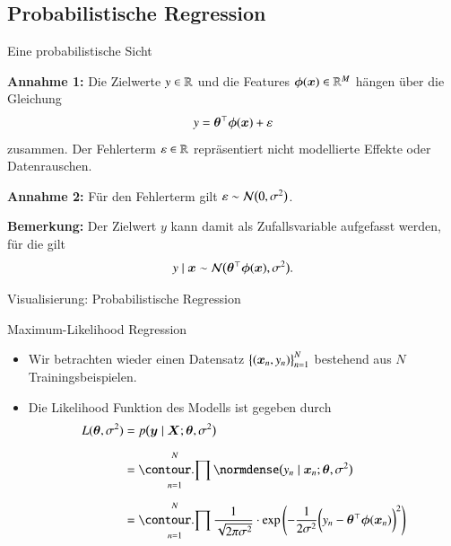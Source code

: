 \subsection{Probabilistische Regression}

\begin{frame}{Eine probabilistische Sicht}{}
	\begin{boxGray}
		\textbf{Annahme 1:} Die Zielwerte $y \in \mathbb{R}$ und die Features $\bm{\phi}(\bm{x}) \in \mathbb{R}^M$ hängen über die Gleichung
		\begin{equation}
			y = \bm{\theta}^\top \bm{\phi}(\bm{x}) + \varepsilon
		\end{equation}
		zusammen. Der Fehlerterm $\varepsilon \in \mathbb{R}$ repräsentiert nicht modellierte Effekte oder Datenrauschen.
	\end{boxGray}
	
	\begin{boxGray}
		\textbf{Annahme 2:} Für den Fehlerterm gilt $\varepsilon \sim \mathcal{N}\bigl( 0, \sigma^2 \bigr)$.
	\end{boxGray}

	\begin{boxGray}
		\textbf{Bemerkung:} Der Zielwert $y$ kann damit als Zufallsvariable aufgefasst werden, für die gilt
		\begin{equation}
			y \mid \bm{x} \sim \mathcal{N}\bigl(\bm{\theta}^\top \bm{\phi}(\bm{x}), \sigma^2 \bigr).
		\end{equation}
	\end{boxGray}
\end{frame}


\begin{frame}{Visualisierung: Probabilistische Regression}{}
	
\end{frame}


\begin{frame}{Maximum-Likelihood Regression}{}
	\begin{itemize}
		\item Wir betrachten wieder einen Datensatz $\bigl\{ (\bm{x}_n, y_n) \bigr\}_{n=1}^N$ bestehend aus $N$ Trainingsbeispielen.
		\item Die Likelihood Funktion des Modells ist gegeben durch
		\begin{equation}
			\label{eq:reg-likelihood}
			\begin{aligned}
				L(\btheta, \sigma^2)
					&= p\bigl( \by \mid \bX; \btheta, \sigma^2 \bigr)
			\\[2mm]
					&= \prod_{n=1}^N \normdense\bigl( y_n \mid \bx_n; \btheta, \sigma^2 \bigr)
			\\[2mm]
					&= \prod_{n=1}^N \frac{1}{\sqrt{2 \pi \sigma^2}} \cdot \exp\left(
						-\frac{1}{2 \sigma^2} \biggl( y_n - \btheta^\top \bphi(\bx_n) \biggr)^2
					\right)
			\end{aligned}
		\end{equation}
	\end{itemize}
\end{frame}


